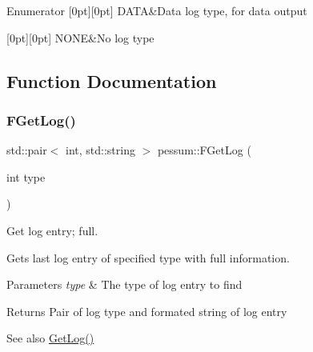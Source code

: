 \begin{DoxyEnumFields}{Enumerator}
[0pt][0pt]{}\mbox{\label{namespacepessum_a0e205f64abc046e94dd38be906430664a044bedc99450343e093dc4e9c51fb560}} 
D\+A\+TA&Data log type, for data output \\
\hline

[0pt][0pt]{}\mbox{\label{namespacepessum_a0e205f64abc046e94dd38be906430664a6d5037a5f004dc37956db8cc5fefed5e}} 
N\+O\+NE&No log type \\
\hline

\end{DoxyEnumFields}


\subsection{Function Documentation}
\mbox{\label{namespacepessum_ae7c3a2695cc96dc4f826e252d5dd4398}} 
\subsubsection{\texorpdfstring{F\+Get\+Log()}{FGetLog()}}
{\footnotesize\ttfamily std\+::pair$<$ int, std\+::string $>$ pessum\+::\+F\+Get\+Log (\begin{DoxyParamCaption}\item[{int}]{type }\end{DoxyParamCaption})}



Get log entry; full. 

Gets last log entry of specified type with full information. 
\begin{DoxyParams}{Parameters}
{\em type} & The type of log entry to find \\
\hline
\end{DoxyParams}
\begin{DoxyReturn}{Returns}
Pair of log type and formated string of log entry 
\end{DoxyReturn}
\begin{DoxySeeAlso}{See also}
\hyperlink{namespacepessum_aa7ccd36394acb961bdd887f32b3572e1}{Get\+Log()} 
\end{DoxySeeAlso}
\mbox{\label{namespacepessum_aa7ccd36394acb961bdd887f32b3572e1}} 
